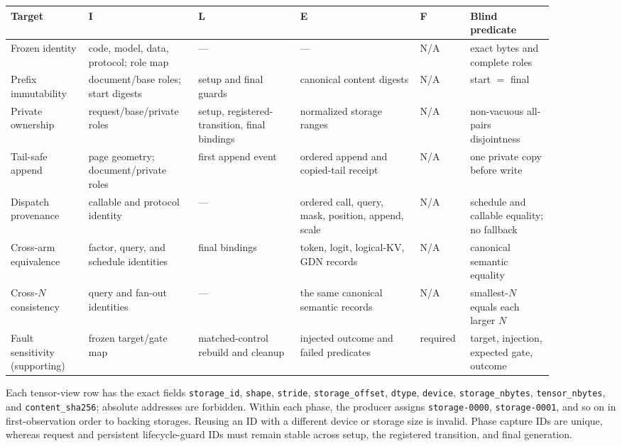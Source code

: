 \documentclass{article}
\begin{document}
\begin{center}
\scriptsize
\setlength{\tabcolsep}{2.5pt}
\begin{tabular}{@{}p{0.13\linewidth}p{0.17\linewidth}p{0.17\linewidth}p{0.20\linewidth}p{0.08\linewidth}p{0.14\linewidth}@{}}
\toprule
Target & I & L & E & F & Blind predicate \\
\midrule
Frozen identity & code, model, data, protocol; role map & --- & --- & N/A & exact bytes and complete roles \\
Prefix immutability & document/base roles; start digests & setup and final guards & canonical content digests & N/A & start $=$ final \\
Private ownership & request/base/private roles & setup, registered-transition, final bindings & normalized storage ranges & N/A & non-vacuous all-pairs disjointness \\
Tail-safe append & page geometry; document/private roles & first append event & ordered append and copied-tail receipt & N/A & one private copy before write \\
Dispatch provenance & callable and protocol identity & --- & ordered call, query, mask, position, append, scale & N/A & schedule and callable equality; no fallback \\
Cross-arm equivalence & factor, query, and schedule identities & final bindings & token, logit, logical-KV, GDN records & N/A & canonical semantic equality \\
Cross-$N$ consistency & query and fan-out identities & --- & the same canonical semantic records & N/A & smallest-$N$ equals each larger $N$ \\
Fault sensitivity (supporting) & frozen target/gate map & matched-control rebuild and cleanup & injected outcome and failed predicates & required & target, injection, expected gate, outcome \\
\bottomrule
\end{tabular}
\end{center}

Each tensor-view row has the exact fields
\texttt{storage\_id}, \texttt{shape}, \texttt{stride},
\texttt{storage\_offset}, \texttt{dtype}, \texttt{device},
\texttt{storage\_nbytes}, \texttt{tensor\_nbytes}, and
\texttt{content\_sha256}; absolute addresses are forbidden.  Within each
phase, the producer assigns \texttt{storage-0000}, \texttt{storage-0001},
and so on in first-observation order to backing storages.  Reusing an ID with
a different device or storage size is invalid.  Phase capture IDs are unique,
whereas request and persistent lifecycle-guard IDs must remain stable across
setup, the registered transition, and final generation.
\end{document}
